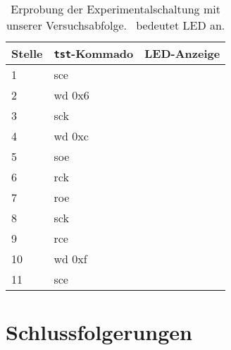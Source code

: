 \documentclass[12pt,a4paper]{scrartcl}
\begin{document}
\newcommand{\off}{\fullmoon}
\newcommand{\on}{\newmoon}

\begin{table}[h]
    \centering
    \caption{Erprobung der Experimentalschaltung mit unserer Versuchsabfolge.
    \on\ bedeutet LED an.}
    \begin{tabular}{l|l|l}
    \hline
    Stelle & \texttt{tst}-Kommado & LED-Anzeige    \\
    \hline
    1      & sce               & \off \off \off \off  \\
    2      & wd 0x6            & \off \off \off \off  \\
    3      & sck               & \off \on  \on  \off \\
    4      & wd 0xc            & \on  \on  \off \off \\
    5      & soe               & \off \off \off \off \\
    6      & rck               & \off \off \off \off \\
    7      & roe               & \on  \on  \off \off  \\
    8      & sck               & \on  \on  \off \off \\
    9      & rce               & \on  \on  \off \off \\
    10     & wd 0xf            & \on  \on  \off \off \\
    11     & sce               & \on  \on  \on  \on  \\
    \hline
    \end{tabular}
    \label{erprobung}
\end{table}



\section{Schlussfolgerungen}
\end{document}
